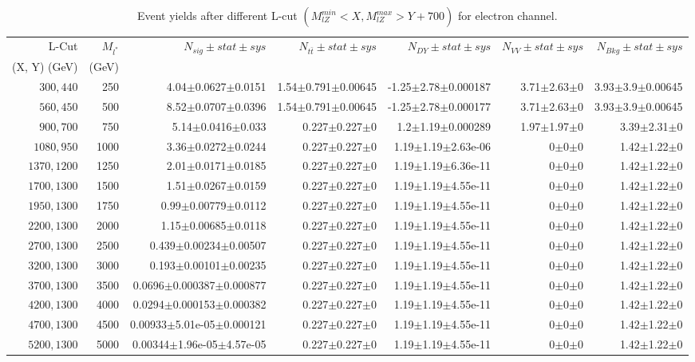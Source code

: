 \documentclass[]{article}
\begin{document}
\begin{table}
\begin{center}
\scriptsize{
\begin{tabular}{ |r|r|r|r|r|r|r|}
\hline 
L-Cut & $M_{l^*}$ & $N_{sig}\pm stat \pm sys $ &$N_{t\bar{t}}\pm stat \pm sys $ & $N_{DY}\pm stat \pm sys $ & $N_{VV}\pm stat \pm sys $ &$N_{Bkg}\pm stat \pm sys$\\
 (X, Y) (GeV) & (GeV) & && &&\\
\hline 
$300, 440$ & 250 & 4.04$\pm$0.0627$\pm$0.0151 & 1.54$\pm$0.791$\pm$0.00645 & -1.25$\pm$2.78$\pm$0.000187 & 3.71$\pm$2.63$\pm$0 & 3.93$\pm$3.9$\pm$0.00645 \\
$560, 450$ & 500 & 8.52$\pm$0.0707$\pm$0.0396 & 1.54$\pm$0.791$\pm$0.00645 & -1.25$\pm$2.78$\pm$0.000177 & 3.71$\pm$2.63$\pm$0 & 3.93$\pm$3.9$\pm$0.00645 \\
$900, 700$ & 750 & 5.14$\pm$0.0416$\pm$0.033 & 0.227$\pm$0.227$\pm$0 & 1.2$\pm$1.19$\pm$0.000289 & 1.97$\pm$1.97$\pm$0 & 3.39$\pm$2.31$\pm$0 \\
$1080,950$ & 1000 & 3.36$\pm$0.0272$\pm$0.0244 & 0.227$\pm$0.227$\pm$0 & 1.19$\pm$1.19$\pm$2.63e-06 & 0$\pm$0$\pm$0 & 1.42$\pm$1.22$\pm$0 \\
$1370,1200$ & 1250 & 2.01$\pm$0.0171$\pm$0.0185 & 0.227$\pm$0.227$\pm$0 & 1.19$\pm$1.19$\pm$6.36e-11 & 0$\pm$0$\pm$0 & 1.42$\pm$1.22$\pm$0 \\
$1700,1300$ & 1500 & 1.51$\pm$0.0267$\pm$0.0159 & 0.227$\pm$0.227$\pm$0 & 1.19$\pm$1.19$\pm$4.55e-11 & 0$\pm$0$\pm$0 & 1.42$\pm$1.22$\pm$0 \\
$1950,1300$ & 1750 & 0.99$\pm$0.00779$\pm$0.0112 & 0.227$\pm$0.227$\pm$0 & 1.19$\pm$1.19$\pm$4.55e-11 & 0$\pm$0$\pm$0 & 1.42$\pm$1.22$\pm$0 \\
$2200,1300$ & 2000 & 1.15$\pm$0.00685$\pm$0.0118 & 0.227$\pm$0.227$\pm$0 & 1.19$\pm$1.19$\pm$4.55e-11 & 0$\pm$0$\pm$0 & 1.42$\pm$1.22$\pm$0 \\
$2700,1300$ & 2500 & 0.439$\pm$0.00234$\pm$0.00507 & 0.227$\pm$0.227$\pm$0 & 1.19$\pm$1.19$\pm$4.55e-11 & 0$\pm$0$\pm$0 & 1.42$\pm$1.22$\pm$0 \\
$3200,1300$ & 3000 & 0.193$\pm$0.00101$\pm$0.00235 & 0.227$\pm$0.227$\pm$0 & 1.19$\pm$1.19$\pm$4.55e-11 & 0$\pm$0$\pm$0 & 1.42$\pm$1.22$\pm$0 \\
$3700,1300$ & 3500 & 0.0696$\pm$0.000387$\pm$0.000877 & 0.227$\pm$0.227$\pm$0 & 1.19$\pm$1.19$\pm$4.55e-11 & 0$\pm$0$\pm$0 & 1.42$\pm$1.22$\pm$0 \\
$4200,1300$ & 4000 & 0.0294$\pm$0.000153$\pm$0.000382 & 0.227$\pm$0.227$\pm$0 & 1.19$\pm$1.19$\pm$4.55e-11 & 0$\pm$0$\pm$0 & 1.42$\pm$1.22$\pm$0 \\
$4700,1300$ & 4500 & 0.00933$\pm$5.01e-05$\pm$0.000121 & 0.227$\pm$0.227$\pm$0 & 1.19$\pm$1.19$\pm$4.55e-11 & 0$\pm$0$\pm$0 & 1.42$\pm$1.22$\pm$0 \\
$5200,1300$ & 5000 & 0.00344$\pm$1.96e-05$\pm$4.57e-05 & 0.227$\pm$0.227$\pm$0 & 1.19$\pm$1.19$\pm$4.55e-11 & 0$\pm$0$\pm$0 & 1.42$\pm$1.22$\pm$0 \\
\hline 
\end{tabular}
}
\end{center}
\caption{Event yields after different L-cut $(M_{lZ}^{min} < X, M_{lZ}^{max} > Y + 700)$ for electron channel.}
\end{table}
\end{document}
